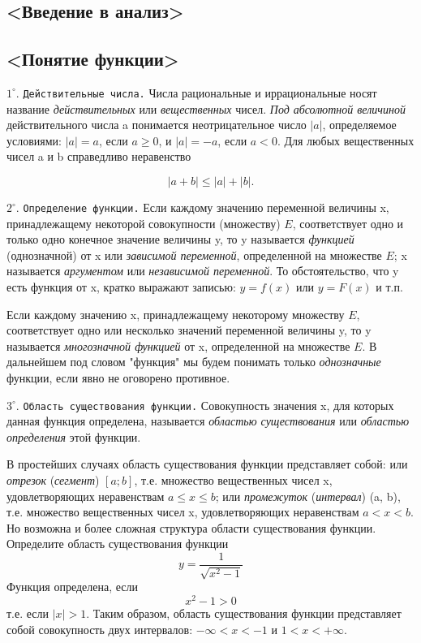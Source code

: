 \documentclass[12pt]{article}
\begin{document}
	
	\tableofcontents
	
	\newpage
	
\begin{center}
	\section[<Введение в анализ>]{<Введение в анализ>}
\end{center}

\subsection[<Понятие функции>]{<Понятие функции>}
\medskip

$1^{\circ}$. {\tt Действительные числа.} Числа рациональные и иррациональные носят название {\it действительных} или {\it вещественных} чисел. {\it Под абсолютной величиной} действительного числа a понимается неотрицательное число $|a|$, определяемое условиями: $|a|=a$, если $a\ge0$, и $|a|=-a$, если $a<0$. Для любых вещественных чисел a и b справедливо неравенство

\[
	|a+b|\le |a|+|b|.
\]

$2^{\circ}$. {\tt Определение функции.} Если каждому значению переменной величины x, принадлежащему некоторой совокупности (множеству) $E$, соответствует одно и только одно конечное значение величины y, то y называется {\it функцией} (однозначной) от x или {\it зависимой переменной}, определенной на множестве $E$; x называется {\it аргументом} или {\it независимой переменной}. То обстоятельство, что y есть функция от x, кратко выражают записью: $y=f(x)$ или $y=F(x)$ и т.п.

Если каждому значению x, принадлежащему некоторому множеству $E$, соответствует одно или несколько значений переменной величины y, то y называется {\it многозначной функцией} от x, определенной на множестве $E$. В дальнейшем под словом "функция" мы будем понимать только {\it однозначные} функции, если явно не оговорено противное.\vspace{2mm}

$3^{\circ}$. {\tt Область существования функции.} Совокупность значения x, для которых данная функция определена, называется {\it областью существования} или {\it областью определения} этой функции.

В простейших случаях область существования функции представляет собой: или {\it отрезок} ({\it сегмент}) $[a; b]$, т.е. множество вещественных чисел x, удовлетворяющих неравенствам $a\le x\le b$; или {\it промежуток} ({\it интервал}) (a, b), т.е. множество вещественных чисел x, удовлетворяющих неравенствам $a<x<b$. Но возможна и более сложная структура области существования функции.
\vspace{1mm}
 Определите область существования функции
\[
	y=\frac{1}{\sqrt{x^2-1}}	
\]
 Функция определена, если 
\[
	x^2-1>0
\]
т.е. если $|x|>1$. Таким образом, область существования функции представляет собой совокупность двух интервалов: $-\infty<x<-1$ и $1<x<+\infty$.\vspace{2mm}
\end{document}
